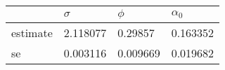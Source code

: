 \begin{tabular}{llll}
\toprule
{} &  $\sigma$ &    $\phi$ & $\alpha_0$ \\
\midrule
estimate &  2.118077 &   0.29857 &   0.163352 \\
se       &  0.003116 &  0.009669 &   0.019682 \\
\bottomrule
\end{tabular}
